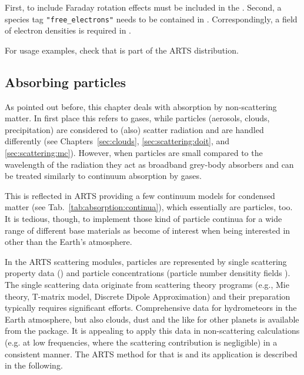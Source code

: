 First, to include Faraday rotation effects
 must be included in the
. Second, a species tag
\verb|"free_electrons"| needs to be contained in .
Correspondingly, a field of electron densities is required in
.

For usage examples, check  that
is part of the ARTS distribution.

\subsection{Absorbing particles}
\label{sec:absorption:particles}

As pointed out before, this chapter deals with absorption by non-scattering
matter. In first place this refers to gases, while particles (aerosols, clouds,
precipitation) are considered to (also) scatter radiation and are handled
differently (see Chapters~\ref{sec:clouds}, \ref{sec:scattering:doit}, and
\ref{sec:scattering:mc}).
However, when particles are small compared to the wavelength of the radiation
they act as broadband grey-body absorbers and can be treated similarly to
continuum absorption by gases.

This is reflected in ARTS providing a few continuum models for condensed
matter (see Tab.~\ref{tab:absorption:continua}), which essentially are
particles, too.
It is tedious, though, to implement those kind of particle continua for a wide
range of different base materials as become of interest when being interested in
other than the Earth's atmosphere.

In the ARTS scattering modules, particles are represented by single scattering
property data () and particle concentrations
(particle number densitity fields ).
The single scattering data originate from scattering theory
programs (e.g., Mie theory, T-matrix model, Discrete Dipole Approximation) and
their preparation typically requires significant efforts. Comprehensive data for
hydrometeors in the Earth atmosphere, but also clouds, dust and the like for
other planets is available from the  package.
It is appealing to apply this data in non-scattering calculations (e.g. at low
frequencies, where the scattering contribution is negligible) in a consistent
manner. The ARTS method for that is  and
its application is described in the following.


